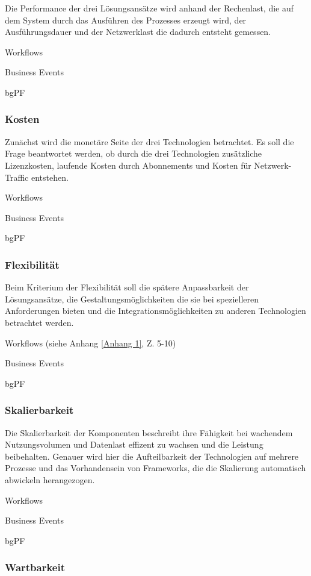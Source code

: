 Die Performance der drei Lösungsansätze wird anhand der Rechenlast, die auf dem System durch das Ausführen des Prozesses erzeugt wird, der Ausführungsdauer und der Netzwerklast die dadurch entsteht gemessen.

Workflows

Business Events

bgPF

\subsubsection{Kosten}

Zunächst wird die monetäre Seite der drei Technologien betrachtet. Es soll die Frage beantwortet werden, ob durch die drei Technologien zusätzliche Lizenzkosten, laufende Kosten durch Abonnements und Kosten für Netzwerk-Traffic entstehen.

Workflows

Business Events

bgPF

\subsubsection{Flexibilität}

Beim Kriterium der Flexibilität soll die spätere Anpassbarkeit der Lösungsansätze, die Gestaltungsmöglichkeiten die sie bei spezielleren Anforderungen bieten und die Integrationsmöglichkeiten zu anderen Technologien betrachtet werden.

Workflows (siehe Anhang \ref{Anhang 1}, Z. 5-10)

Business Events

bgPF

\subsubsection{Skalierbarkeit}

Die Skalierbarkeit der Komponenten beschreibt ihre Fähigkeit bei wachendem Nutzungsvolumen und Datenlast effizent zu wachsen und die Leistung beibehalten. Genauer wird hier die Aufteilbarkeit der Technologien auf mehrere Prozesse und das Vorhandensein von Frameworks, die die Skalierung automatisch abwickeln herangezogen.

Workflows

Business Events

bgPF

\subsubsection{Wartbarkeit}

